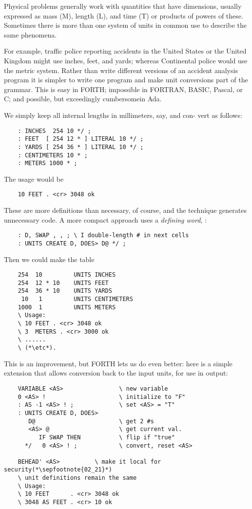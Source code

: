 Physical problems generally work with quantities that have dimensions, usually expressed as mass (M), length (L), and time (T) or products of powers of these. Sometimes there is more than one system of units in common use to describe the same phenomena.

For example, traffic police reporting accidents in the United States or the United Kingdom might use inches, feet, and yards; whereas Continental police would use the metric system. Rather than write different versions of an accident analysis program it is simpler to write one program and make unit conversions part of the grammar. This is easy in FORTH; impossible in FORTRAN, BASIC, Pascal, or C; and possible, but exceedingly cumbersomein Ada.

We simply keep all internal lengths in millimeters, say, and con-
vert as follows:

\begin{lstlisting}
    : INCHES  254 10 */ ;
    : FEET  [ 254 12 * ] LITERAL 10 */ ;
    : YARDS [ 254 36 * ] LITERAL 10 */ ;
    : CENTIMETERS 10 * ;
    : METERS 1000 * ;
\end{lstlisting}

The usage would be
\begin{lstlisting}
    10 FEET . <cr> 3048 ok
\end{lstlisting}

These are more definitions than necessary, of course, and the technique generates unnecessary code. A more compact approach uses a \textit{defining word}, :

\begin{lstlisting}
    : D, SWAP , , ; \ I double-length # in next cells
    : UNITS CREATE D, DOES> D@ */ ;
\end{lstlisting}

Then we could make the table
\begin{lstlisting}
    254  10         UNITS INCHES
    254  12 * 10    UNITS FEET
    254  36 * 10    UNITS YARDS
     10   1         UNITS CENTIMETERS
    1000  1         UNITS METERS
    \ Usage:
    \ 10 FEET . <cr> 3048 ok
    \ 3  METERS . <cr> 3000 ok
    \ ......
    \ (*\etc*).
\end{lstlisting}

This is an improvement, but FORTH lets us do even better: here is a simple extension that allows conversion back to the input units, for use in output:

\begin{lstlisting}
    VARIABLE <AS>                \ new variable
    0 <AS> !                     \ initialize to "F"
    : AS -1 <AS> ! ;             \ set <AS> = "T"
    : UNITS CREATE D, DOES>
       D@                        \ get 2 #s
       <AS> @                    \ get current val.
          IF SWAP THEN           \ flip if "true"
      */   0 <AS> ! ;            \ convert, reset <AS>

    BEHEAD' <AS>          \ make it local for security(*\sepfootnote{02_21}*)
    \ unit definitions remain the same
    \ Usage:
    \ 10 FEET      . <cr> 3048 ok
    \ 3048 AS FEET . <cr> 10 ok
\end{lstlisting}

